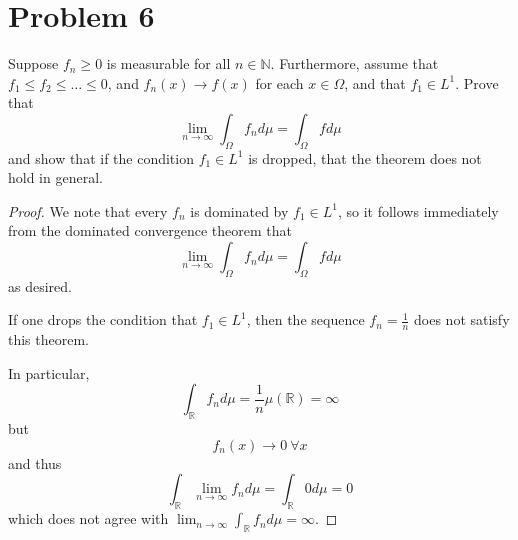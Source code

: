 \documentclass[fontsize=11pt]{scrartcl} %
\numberwithin{equation}{section} %
\numberwithin{figure}{section} %
\numberwithin{table}{section} %
\newcommand{\R}{\mathbb{R}}
\newcommand{\N}{\mathbb{N}}
\theoremstyle{definition}
\begin{document}
\section*{Problem 6}
Suppose $f_n\geq0$ is measurable for all $n\in\N$. Furthermore, assume that $f_1\leq f_2\leq\ldots\leq 0$,
and $f_n(x)\to f(x)$ for each $x\in\Omega$, and that $f_1\in L^1$.
Prove that
\[
\lim_{n\to\infty}\int_{\Omega}f_nd\mu = \int_{\Omega}fd\mu
\]
and show that if the condition $f_1\in L^1$ is dropped, that the theorem does not hold in general.
\\
\begin{proof}
We note that every $f_n$ is dominated by $f_1\in L^1$, so it follows immediately from the
dominated convergence theorem that
\[
\lim_{n\to\infty}\int_{\Omega}f_nd\mu = \int_{\Omega}fd\mu
\]
as desired.

If one drops the condition that $f_1\in L^1$, then the sequence
$f_n = \frac{1}{n}$ does not satisfy this theorem.

In particular,
\[
\int_{\R}f_nd\mu = \frac{1}{n}\mu(\R)=\infty
\]
but
\[
f_n(x)\to0\ \forall x
\]
and thus
\[
\int_{\R}\lim_{n\to\infty} f_nd\mu = \int_{\R}0d\mu = 0
\]
which does not agree with $\lim_{n\to\infty}\int_{\R}f_nd\mu=\infty$.
\end{proof}

\end{document}
